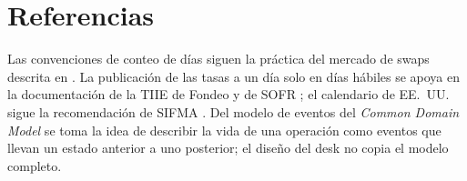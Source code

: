 \section{Referencias}\label{sec:cap08-referencias}

Las convenciones de conteo de días siguen la práctica del mercado de swaps descrita en \citet{hull2018}. La publicación de las tasas a un día solo en días hábiles se apoya en la documentación de la TIIE de Fondeo \citep{banxico2021} y de SOFR \citep{nyfed2026}; el calendario de EE.~UU. sigue la recomendación de SIFMA \citep{sifma2026}. Del modelo de eventos del \emph{Common Domain Model} \citep{cdm2026} se toma la idea de describir la vida de una operación como eventos que llevan un estado anterior a uno posterior; el diseño del desk no copia el modelo completo.
